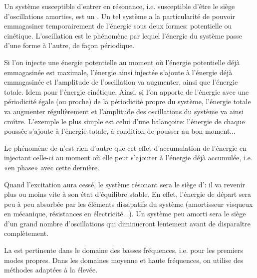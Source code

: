\medskip
Un système susceptible d'entrer en résonance, i.e. susceptible d'être le siège d'oscillations amorties, est un . Un tel système a la particularité de pouvoir emmagasiner temporairement de l'énergie sous deux formes: potentielle ou cinétique. L'oscillation est le phénomène par lequel l'énergie du système passe d'une forme à l'autre, de façon périodique.

Si l'on injecte une énergie potentielle au moment où l'énergie potentielle déjà emmagasinée est maximale, l'énergie ainsi injectée s'ajoute à l'énergie déjà emmagasinée et l'amplitude de l'oscillation va augmenter, ainsi que l'énergie totale. Idem pour l'énergie cinétique. Ainsi, si l'on apporte de l'énergie avec une périodicité égale (ou proche) de la périodicité propre du système, l'énergie totale va augmenter régulièrement et l'amplitude des oscillations du système va ainsi croître. L'exemple le plus simple est celui d'une balançoire: l'énergie de chaque poussée s'ajoute à l'énergie totale, à condition de pousser au bon moment...

Le phénomène de  n'est rien d'autre que cet effet d'accumulation de l'énergie en injectant celle-ci au moment où elle peut s'ajouter à l'énergie déjà accumulée, i.e. «en phase» avec cette dernière.

\medskip
Quand l'excitation aura cessé, le système résonant sera le siège d': il va revenir plus ou moins vite à son état d'équilibre stable. En effet, l'énergie de départ sera peu à peu absorbée par les éléments dissipatifs du système (amortisseur visqueux en mécanique, résistances en électricité...). Un système peu amorti sera le siège d'un grand nombre d'oscillations qui diminueront lentement avant de disparaître complètement.

\medskip
La  est pertinente dans le domaine des basses fréquences, i.e. pour les premiers modes propres. Dans les domaines moyenne et haute fréquences, on utilise des méthodes adaptées à la  élevée.

